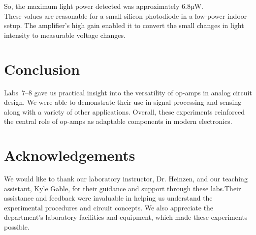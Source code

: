 \documentclass{article}
\begin{document}
\noindent So, the maximum light power detected was approximately $6.8$µW.\\

\noindent These values are reasonable for a small silicon photodiode in a
low-power indoor setup. The amplifier's high gain enabled it to convert 
the small changes in light intensity to measurable voltage changes.

\section*{Conclusion}

Labs~7--8 gave us practical insight into the versatility of op-amps in analog
circuit design. We were able to demonstrate their use in signal processing and
sensing along with a variety of other applications. Overall, these experiments
reinforced the central role of op-amps as adaptable components in modern 
electronics.

\section*{Acknowledgements}

We would like to thank our laboratory instructor, Dr. Heinzen, and our teaching 
assistant, Kyle Gable, for their guidance and support through these labs.Their 
assistance and feedback were invaluable in helping us understand the experimental 
procedures and circuit concepts. We also appreciate the department's laboratory 
facilities and equipment, which made these experiments possible.
\end{document}
